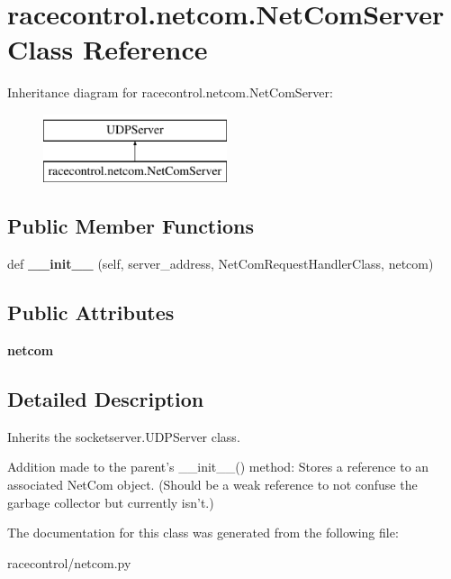 \section{racecontrol.\+netcom.\+Net\+Com\+Server Class Reference}
\label{classracecontrol_1_1netcom_1_1NetComServer}
Inheritance diagram for racecontrol.\+netcom.\+Net\+Com\+Server\+:\begin{figure}[H]
\begin{center}
\leavevmode
\includegraphics[height=2.000000cm]{classracecontrol_1_1netcom_1_1NetComServer}
\end{center}
\end{figure}
\subsection*{Public Member Functions}
\begin{DoxyCompactItemize}
\item 
def {\bfseries \+\_\+\+\_\+init\+\_\+\+\_\+} (self, server\+\_\+address, Net\+Com\+Request\+Handler\+Class, netcom)\label{classracecontrol_1_1netcom_1_1NetComServer_a9bb05aad9d87c4e06b41c06d6226e91e}

\end{DoxyCompactItemize}
\subsection*{Public Attributes}
\begin{DoxyCompactItemize}
\item 
{\bfseries netcom}\label{classracecontrol_1_1netcom_1_1NetComServer_ae4138cdb5ab515c42227886ff80bf88c}

\end{DoxyCompactItemize}


\subsection{Detailed Description}
\begin{DoxyVerb}Inherits the socketserver.UDPServer class.

Addition made to the parent's __init__() method: Stores a reference to an
associated NetCom object. (Should be a weak reference to not confuse the
garbage collector but currently isn't.)
\end{DoxyVerb}
 

The documentation for this class was generated from the following file\+:\begin{DoxyCompactItemize}
\item 
racecontrol/netcom.\+py\end{DoxyCompactItemize}
